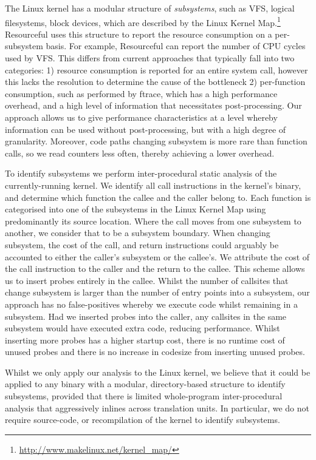 \documentclass[letterpaper,twocolumn,10pt]{article}
\newcommand{\pname}{Resourceful}
\begin{document}
The Linux kernel has a modular structure of \emph{subsystems}, such as VFS, logical filesystems, block devices, which are described by the Linux Kernel Map.\footnote{\url{http://www.makelinux.net/kernel_map/}}
\pname{ } uses this structure to report the resource consumption on a per-subsystem basis.
For example, \pname{ } can report the number of CPU cycles used by VFS.
This differs from current approaches that typically fall into two categories: 1) resource consumption is reported for an entire system call, however this lacks the resolution to determine the cause of the bottleneck 2) per-function consumption, such as performed by ftrace, which has a high performance overhead, and a high level of information that necessitates post-processing.
Our approach allows us to give performance characteristics at a level whereby information can be used without post-processing, but with a high degree of granularity.
Moreover, code paths changing subsystem is more rare than function calls, so we read counters less often, thereby achieving a lower overhead.

To identify subsystems we perform inter-procedural static analysis of the currently-running kernel.
We identify all call instructions in the kernel's binary, and determine which function the callee and the caller belong to.
Each function is categorised into one of the subsystems in the Linux Kernel Map using predominantly its source location.
Where the call moves from one subsystem to another, we consider that to be a subsystem boundary.
When changing subsystem, the cost of the call, and return instructions could arguably be accounted to either the caller's subsystem or the callee's.
We attribute the cost of the call instruction to the caller and the return to the callee.
This scheme allows us to insert probes entirely in the callee.
Whilst the number of callsites that change subsystem is larger than the number of entry points into a subsystem, our approach has no false-positives whereby we execute code whilst remaining in a subsystem.
Had we inserted probes into the caller, any callsites in the same subsystem would have executed extra code, reducing performance.
Whilst inserting more probes has a higher startup cost, there is no runtime cost of unused probes and there is no increase in codesize from inserting unused probes.


Whilst we only apply our analysis to the Linux kernel, we believe that it could be applied to any binary with a modular, directory-based structure to identify subsystems, provided that there is limited whole-program inter-procedural analysis that aggressively inlines across translation units.
In particular, we do not require source-code, or recompilation of the kernel to identify subsystems.
\end{document}
